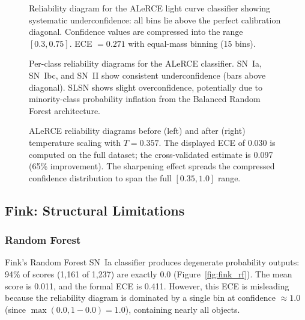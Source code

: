\documentclass[twocolumn]{aastex631}
\begin{document}
\begin{figure}
\caption{Reliability diagram for the ALeRCE light curve classifier showing systematic underconfidence: all bins lie above the perfect calibration diagonal. Confidence values are compressed into the range $[0.3, 0.75]$. ECE $= 0.271$ with equal-mass binning (15 bins). \label{fig:alerce_reliability}}
\end{figure}

\begin{figure}
\caption{Per-class reliability diagrams for the ALeRCE classifier. SN~Ia, SN~Ibc, and SN~II show consistent underconfidence (bars above diagonal). SLSN shows slight overconfidence, potentially due to minority-class probability inflation from the Balanced Random Forest architecture. \label{fig:alerce_perclass}}
\end{figure}

\begin{figure}
\caption{ALeRCE reliability diagrams before (left) and after (right) temperature scaling with $T = 0.357$. The displayed ECE of 0.030 is computed on the full dataset; the cross-validated estimate is 0.097 (65\% improvement). The sharpening effect spreads the compressed confidence distribution to span the full $[0.35, 1.0]$ range. \label{fig:alerce_tempscaling}}
\end{figure}


\subsection{Fink: Structural Limitations} \label{sec:fink}

\subsubsection{Random Forest}

Fink's Random Forest SN~Ia classifier produces degenerate probability outputs: 94\% of scores (1,161 of 1,237) are exactly 0.0 (Figure~\ref{fig:fink_rf}). The mean score is 0.011, and the formal ECE is 0.411. However, this ECE is misleading because the reliability diagram is dominated by a single bin at confidence $\approx 1.0$ (since $\max(0.0, 1 - 0.0) = 1.0$), containing nearly all objects.
\end{document}
